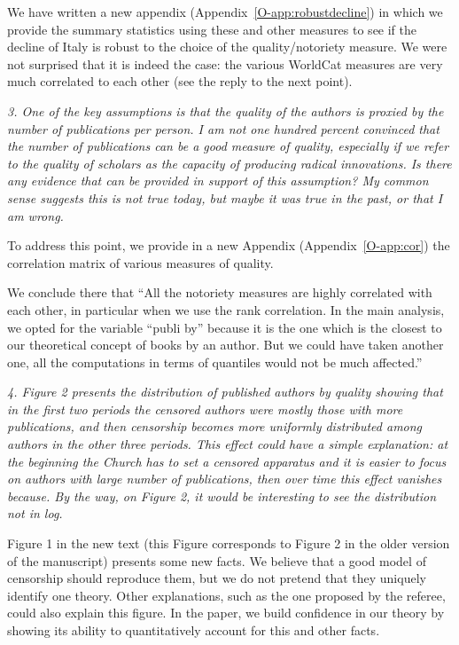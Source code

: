 \documentclass[12pt]{article}
\begin{document}
We have written a new appendix (Appendix~\ref{O-app:robustdecline}) in which we provide the summary statistics using these and other measures to see if the decline of Italy is robust to the choice of the quality/notoriety measure. We were not surprised that it is indeed the case: the various WorldCat measures are very much correlated to each other (see the reply to the next point).



\textit{
3. One of the key assumptions is that the quality of the authors is proxied by the number of publications per
person. I am not one hundred percent convinced that the number of publications can be a good measure of
quality, especially if we refer to the quality of scholars as the capacity of producing radical innovations. Is
there any evidence that can be provided in support of this assumption? My common sense suggests this is
not true today, but maybe it was true in the past, or that I am wrong.
}

To address this point, we provide in a new Appendix  (Appendix~\ref{O-app:cor}) the correlation matrix of various measures of quality.

We conclude there that ``All the notoriety measures are highly correlated with each other, in particular when we use the rank correlation. In the main analysis, we opted for the variable ``publi by'' because it is the one which is the closest to our theoretical concept of books by an author. But we could have taken another one, all the computations in terms of quantiles would not be much affected.''



\textit{
4. Figure 2 presents the distribution of published authors by quality showing that in the first two periods the
censored authors were mostly those with more publications, and then censorship becomes more uniformly
distributed among authors in the other three periods. This effect could have a simple explanation: at the
beginning the Church has to set a censored apparatus and it is easier to focus on authors with large number
of publications, then over time this effect vanishes because. By the way, on Figure 2, it would be interesting
to see the distribution not in log.
}

Figure 1 in the new text (this Figure corresponds to Figure 2 in the older version of the manuscript) presents some new facts. We believe that a good model of censorship should reproduce them, but we do not pretend that they uniquely identify one theory. Other explanations, such as the one proposed by the referee, could also explain this figure. In the paper, we build confidence in our theory by showing its ability to quantitatively account for this and other facts.
\end{document}
